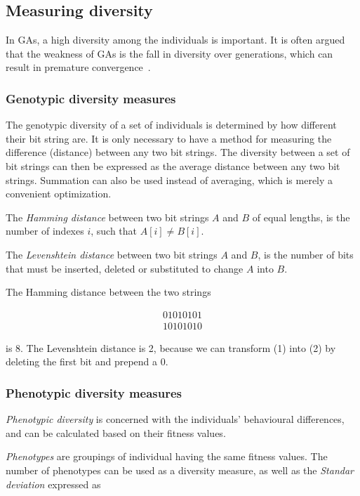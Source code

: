 \subsection{Measuring diversity}
In GAs, a high diversity among the individuals is important. It is often argued that the weakness of GAs is the fall in diversity over generations, which can result in premature convergence~\cite{diaz2007empirical, 1266373,Zitzler00comparisonof}.

\subsubsection{Genotypic diversity measures}
The genotypic diversity of a set of individuals is determined by how different their bit string are.
It is only necessary to have a method for measuring the difference (distance) between any two bit strings.
The diversity between a set of bit strings can then be expressed as the average distance between any two bit strings.
Summation can also be used instead of averaging\cite{1250187}, which is merely a convenient optimization.

The \emph{Hamming distance} between two bit strings $A$ and $B$ of equal lengths, is the number of indexes $i$, such that $A[i] \neq B[i]$\cite{1250187}.

The \emph{Levenshtein distance} between two bit strings $A$ and $B$, is the number of bits that must be inserted, deleted or substituted to change $A$ into $B$\cite{1250187}.

The Hamming distance between the two strings

\begin{align}
    01010101 \\
    10101010
\end{align}

is 8. The Levenshtein distance is 2, because we can transform (1) into (2) by deleting the first bit and prepend a $0$.

\subsubsection{Phenotypic diversity measures}
\emph{Phenotypic diversity} is concerned with the individuals' behavioural differences, and can be calculated based on their fitness values\cite{1250187}.

\emph{Phenotypes} are groupings of individual having the same fitness values. 
The number of phenotypes can be used as a diversity measure, as well as the \emph{Standar deviation} expressed as

